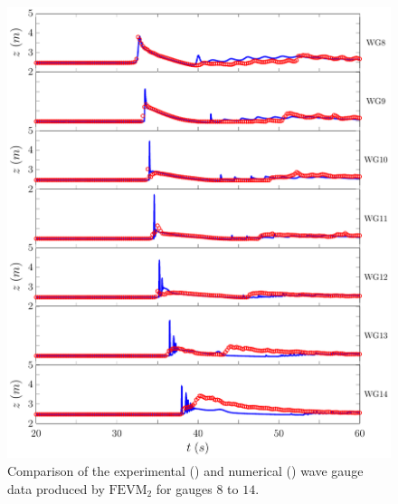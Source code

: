 \begin{figure}
	\centering
	\includegraphics[width=\textwidth]{./chp6/figures/Experiment/Roeber/Trial8/FEVM/LongWGs2.pdf}
	\caption{Comparison of the experimental () and numerical ({\color{blue}\solidrule}) wave gauge data produced by $\text{FEVM}_2$ for gauges $8$ to $14$.}
	\label{fig:Roeber8WG7to14FEVM}
\end{figure}          

